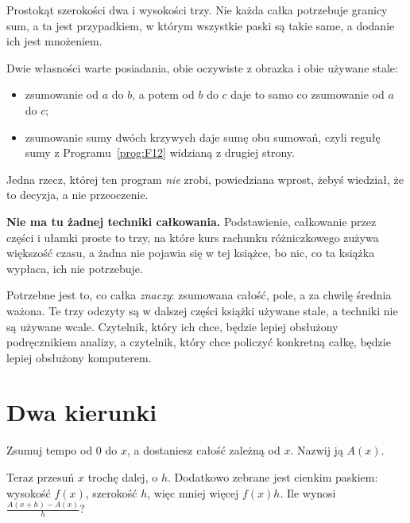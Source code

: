 \begin{fr}
Prostokąt szerokości dwa i wysokości trzy. Nie każda całka potrzebuje granicy
sum, a ta jest przypadkiem, w którym wszystkie paski są takie same, a dodanie
ich jest mnożeniem.

Dwie własności warte posiadania, obie oczywiste z obrazka i obie używane
stale:

\begin{itemize}
\item zsumowanie od $a$ do $b$, a potem od $b$ do $c$ daje to samo co
  zsumowanie od $a$ do $c$;
\item zsumowanie sumy dwóch krzywych daje sumę obu sumowań, czyli regułę sumy
  z Programu~\ref{prog:F12} widzianą z drugiej strony.
\end{itemize}
\end{fr}

\begin{fr}
Jedna rzecz, której ten program \emph{nie} zrobi, powiedziana wprost, żebyś
wiedział, że to decyzja, a nie przeoczenie.

\textbf{Nie ma tu żadnej techniki całkowania.} Podstawienie, całkowanie przez
części i ułamki proste to trzy, na które kurs rachunku różniczkowego zużywa
większość czasu, a żadna nie pojawia się w tej książce, bo nic, co ta książka
wypłaca, ich nie potrzebuje.

Potrzebne jest to, co całka \emph{znaczy}: zsumowana całość, pole, a za chwilę
średnia ważona. Te trzy odczyty są w dalszej części książki używane stale, a
techniki nie są używane wcale. Czytelnik, który ich chce, będzie lepiej
obsłużony podręcznikiem analizy, a czytelnik, który chce policzyć konkretną
całkę, będzie lepiej obsłużony komputerem.
\end{fr}

\section{Dwa kierunki}
\label{sec:F13-inverse}

\begin{fr}
Zsumuj tempo od $0$ do $x$, a dostaniesz całość zależną od $x$. Nazwij ją
$A(x)$.

Teraz przesuń $x$ trochę dalej, o $h$. Dodatkowo zebrane jest cienkim paskiem:
wysokość $f(x)$, szerokość $h$, więc mniej więcej $f(x)h$. Ile wynosi
$\frac{A(x+h) - A(x)}{h}$?
\dotline
\nextframe
\end{fr}

